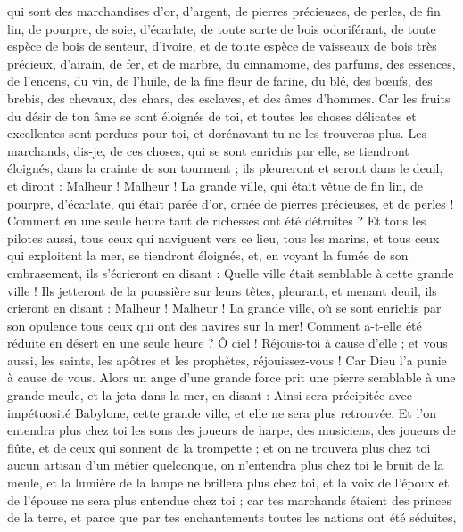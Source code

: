 \begin{multicols}{2}
qui sont des marchandises d'or, d'argent, de pierres précieuses, de perles, de fin lin, de pourpre, de soie, d'écarlate, de toute sorte de bois odoriférant, de toute espèce de bois de senteur, d'ivoire, et de toute espèce de vaisseaux de bois très précieux, d'airain, de fer, et de marbre,
du cinnamome, des parfums, des essences, de l'encens, du vin, de l'huile, de la fine fleur de farine, du blé, des bœufs, des brebis, des chevaux, des chars, des esclaves, et des âmes d'hommes.
Car les fruits du désir de ton âme se sont éloignés de toi, et toutes les choses délicates et excellentes sont perdues pour toi, et dorénavant tu ne les trouveras plus.
Les marchands, dis-je, de ces choses, qui se sont enrichis par elle, se tiendront éloignés, dans la crainte de son tourment ; ils pleureront et seront dans le deuil,
et diront : Malheur ! Malheur ! La grande ville, qui était vêtue de fin lin, de pourpre, d'écarlate, qui était parée d'or, ornée de pierres précieuses, et de perles ! Comment en une seule heure tant de richesses ont été détruites ?
Et tous les pilotes aussi, tous ceux qui naviguent vers ce lieu, tous les marins, et tous ceux qui exploitent la mer, se tiendront éloignés,
et, en voyant la fumée de son embrasement, ils s'écrieront en disant : Quelle ville était semblable à cette grande ville !
Ils jetteront de la poussière sur leurs têtes, pleurant, et menant deuil, ils crieront en disant : Malheur ! Malheur ! La grande ville, où se sont enrichis par son opulence tous ceux qui ont des navires sur la mer! Comment a-t-elle été réduite en désert en une seule heure ?
Ô ciel ! Réjouis-toi à cause d'elle ; et vous aussi, les saints, les apôtres et les prophètes, réjouissez-vous ! Car Dieu l'a punie à cause de vous.
Alors un ange d'une grande force prit une pierre semblable à une grande meule, et la jeta dans la mer, en disant : Ainsi sera précipitée avec impétuosité Babylone, cette grande ville, et elle ne sera plus retrouvée.
Et l'on entendra plus chez toi les sons des joueurs de harpe, des musiciens, des joueurs de flûte, et de ceux qui sonnent de la trompette ; et on ne trouvera plus chez toi aucun artisan d'un métier quelconque, on n'entendra plus chez toi le bruit de la meule,
et la lumière de la lampe ne brillera plus chez toi, et la voix de l'époux et de l'épouse ne sera plus entendue chez toi ; car tes marchands étaient des princes de la terre, et parce que par tes enchantements toutes les nations ont été séduites,

\end{multicols}
